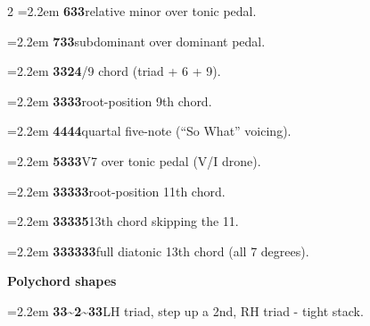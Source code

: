 \documentclass[12pt]{article}
\begin{document}
\begin{multicols}{2}
\noindent\hangindent=2.2em {\juliamono\bfseries 633}\enspace\textemdash\enspace relative minor over tonic pedal.\par
\noindent\hangindent=2.2em {\juliamono\bfseries 733}\enspace\textemdash\enspace subdominant over dominant pedal.\par
\noindent\hangindent=2.2em {\juliamono\bfseries 3324}\enspace\textemdash{}/9 chord (triad + 6 + 9).\par
\noindent\hangindent=2.2em {\juliamono\bfseries 3333}\enspace\textemdash\enspace root-position 9th chord.\par
\noindent\hangindent=2.2em {\juliamono\bfseries 4444}\enspace\textemdash\enspace quartal five-note (“So What” voicing).\par
\noindent\hangindent=2.2em {\juliamono\bfseries 5333}\enspace\textemdash\enspace V7 over tonic pedal (V/I drone).\par
\noindent\hangindent=2.2em {\juliamono\bfseries 33333}\enspace\textemdash\enspace root-position 11th chord.\par
\noindent\hangindent=2.2em {\juliamono\bfseries 33335}\enspace\textemdash\enspace 13th chord skipping the 11.\par
\noindent\hangindent=2.2em {\juliamono\bfseries 333333}\enspace\textemdash\enspace full diatonic 13th chord (all 7 degrees).\par
\noindent\textbf{\large Polychord shapes}\par\vspace{0.15em}
\noindent\hangindent=2.2em {\juliamono\bfseries 33\textasciitilde{}2\textasciitilde{}33}\enspace\textemdash\enspace LH triad, step up a 2nd, RH triad - tight stack.\par

\end{multicols}
\end{document}
